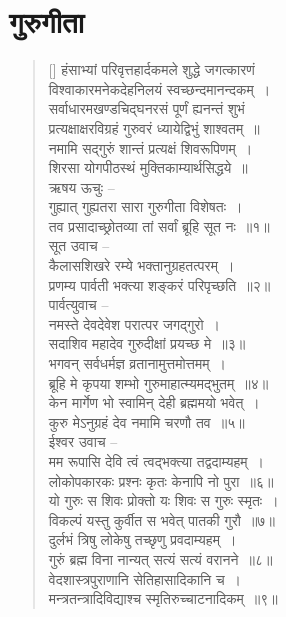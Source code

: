 \documentclass[twoside,12pt,notitlepage]{book}
\begin{document}
\section{गुरुगीता}
\begin{verse}[\versewidth]
हंसाभ्यां परिवृत्तहार्दकमले शुद्धे जगत्कारणं\\[-6pt]
विश्वाकारमनेकदेहनिलयं स्वच्छन्दमानन्दकम्~।\\[-6pt]
सर्वाधारमखण्डचिद्घनरसं पूर्णं ह्यनन्तं शुभं\\[-6pt]
प्रत्यक्षाक्षरविग्रहं गुरुवरं ध्यायेद्विभुं शाश्वतम्~॥\\
नमामि सद्गुरुं शान्तं प्रत्यक्षं शिवरूपिणम्~।\\[-6pt]
शिरसा योगपीठस्थं मुक्तिकाम्यार्थसिद्धये~॥\\
ऋषय ऊचुः –\\
गुह्यात् गुह्यतरा सारा गुरुगीता विशेषतः~।\\[-6pt]
तव प्रसादाच्छ्रोतव्या तां सर्वां ब्रूहि सूत नः~॥१॥\\
सूत उवाच –\\
कैलासशिखरे रम्ये भक्तानुग्रहतत्परम्~।\\[-6pt]
प्रणम्य पार्वती भक्त्या शङ्करं परिपृच्छति~॥२॥\\
पार्वत्युवाच –\\
नमस्ते देवदेवेश परात्पर जगद्गुरो~।\\[-6pt]
सदाशिव महादेव गुरुदीक्षां प्रयच्छ मे~॥३॥\\
भगवन् सर्वधर्मज्ञ व्रतानामुत्तमोत्तमम्~।\\[-6pt]
ब्रूहि मे कृपया शम्भो गुरुमाहात्म्यमद्भुतम्~॥४॥\\
केन मार्गेण भो स्वामिन् देही ब्रह्ममयो भवेत्~।\\[-6pt]
कुरु मेऽनुग्रहं देव नमामि चरणौ तव~॥५॥\\
ईश्वर उवाच – \\
मम रूपासि देवि त्वं त्वद्भक्त्या तद्वदाम्यहम्~।\\[-6pt]
लोकोपकारकः प्रश्नः कृतः केनापि नो पुरा~॥६॥\\
यो गुरुः स शिवः प्रोक्तो यः शिवः स गुरुः स्मृतः~।\\[-6pt]
विकल्पं यस्तु कुर्वीत स भवेत् पातकी गुरौ~॥७॥\\
दुर्लभं त्रिषु लोकेषु तच्छृणु प्रवदाम्यहम्~।\\[-6pt]
गुरुं ब्रह्म विना नान्यत् सत्यं सत्यं वरानने~॥८॥\\
वेदशास्त्रपुराणानि सेतिहासादिकानि च~।\\[-6pt]
मन्त्रतन्त्रादिविद्याश्च स्मृतिरुच्चाटनादिकम्~॥९॥\\

\end{verse}
\end{document}
